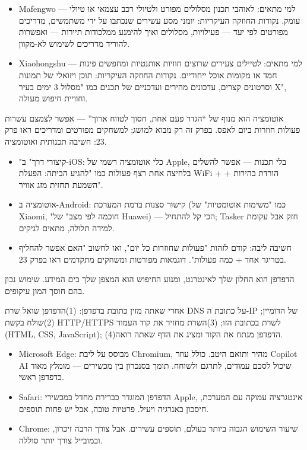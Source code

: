 
\begin{itemize}
  \item Mafengwo — למי מתאים: לאוהבי תכנון מסלולים מפורט ולטיולי רכב עצמאי או טיולי עומק. נקודות החוזקה העיקריות: יומני מסע עשירים שנכתבו על ידי משתמשים, מדריכים מפורטים לפי יעד — פעילויות, מסלולים ואיך להימנע ממלכודות תיירות — ואפשרות להוריד מדריכים לשימוש לא-מקוון.
  \item Xiaohongshu — למי מתאים: לטיילים צעירים שרוצים חוויות אותנטיות ומחפשים פינות חמד או מקומות אוכל ייחודיים. נקודות החוזקה העיקריות: תוכן ויזואלי של תמונות וסרטונים קצרים, עדכונים מהירים ועדכניים של תכנים כמו "מסלול 3 ימים בעיר X", וחוויית חיפוש מעולה.
\end{itemize}


אוטומציה הוא מנוף של “הגדר פעם אחת, חסוך לטווח ארוך” — אפשר לצמצם עשרות פעולות חוזרות ביום לאפס. בפרק זה רק מבוא למושג; למשחקים מפורטים ומדריכים ראו פרק 23: חשיבה תכנותית ואוטומציה.

\begin{itemize}
  \item "קיצורי דרך" ב-iOS: כלי אוטומציה רשמי של Apple, בלי תכנות — אפשר להשלים בלחיצה אחת רצף פעולות כמו "להגיע הביתה: הפעלת WiFi + הורדת בהירות + השמעת תחזית מזג אוויר".
  \item אוטומציה ב-Android: קישור סצנות ברמת המערכת (כמו "משימות אוטומטיות" של Xiaomi, "חוכמה לפי מצב" של Huawei) — הכי קל להתחיל; Tasker חזק אבל עקומת למידה תלולה, מתאים לגיקים.
  \item חשיבה ליבה: קודם לזהות "פעולות שחוזרות כל יום", ואז לחשוב "האם אפשר להחליף בטריגר אחד + כמה פעולות". דוגמאות מפורטות ומשחקים מתקדמים ראו בפרק 23.
\end{itemize}


הדפדפן הוא החלון שלך לאינטרנט, ומנוע החיפוש הוא המצפן שלך בים המידע. שימוש נכון בהם חוסך המון עיקופים.


אחרי שאתה מזין כתובת בדפדפן: (1)הדפדפן שואל שרת DNS על כתובת ה-IP של הדומיין; (2)שולח בקשת HTTP/HTTPS לשרת בכתובת הזו; (3)השרת מחזיר את קוד העמוד (HTML, CSS, JavaScript); (4)הדפדפן מנתח את הקוד ומציג את הדף שאתה רואה.


\begin{itemize}
  \item Microsoft Edge: מבוסס על ליבת Chromium, מהיר ותואם היטב. כולל עוזר Copilot AI שיכול לסכם עמודים, לתרגם ולשוחח. תומך בסנכרון בין מכשירים — מומלץ מאוד כדפדפן ראשי.
  \item Safari: הדפדפן המוגדר כברירת מחדל במכשירי Apple, אינטגרציה עמוקה עם המערכת, חיסכון באנרגיה ויעיל. פרטיות טובה, אבל יש פחות תוספים.
  \item Chrome: שיעור השימוש הגבוה ביותר בעולם, תוספים עשירים. אבל צורך הרבה זיכרון, ובמובייל צורך יותר סוללה.
\end{itemize}


